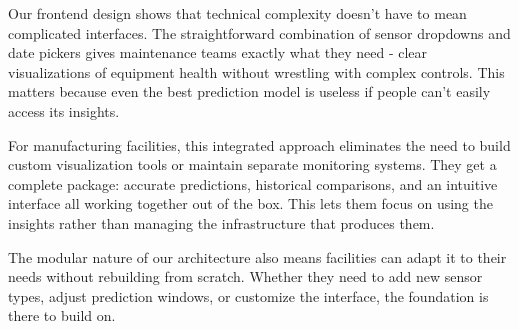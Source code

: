 Our frontend design shows that technical complexity doesn't have to mean complicated interfaces. The straightforward combination of sensor dropdowns and date pickers gives maintenance teams exactly what they need - clear visualizations of equipment health without wrestling with complex controls. This matters because even the best prediction model is useless if people can't easily access its insights.

For manufacturing facilities, this integrated approach eliminates the need to build custom visualization tools or maintain separate monitoring systems. They get a complete package: accurate predictions, historical comparisons, and an intuitive interface all working together out of the box. This lets them focus on using the insights rather than managing the infrastructure that produces them.

The modular nature of our architecture also means facilities can adapt it to their needs without rebuilding from scratch. Whether they need to add new sensor types, adjust prediction windows, or customize the interface, the foundation is there to build on.